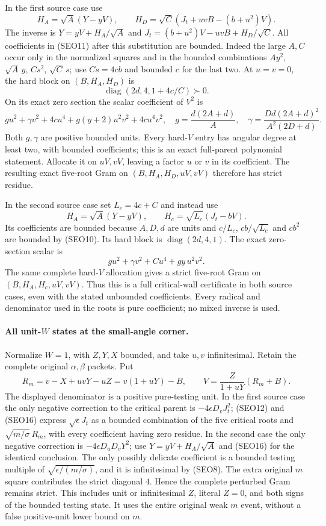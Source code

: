 In the first source case use
\[
 H_A=\sqrt A(Y-yV),\qquad
 H_D=\sqrt C(J_t+uvB-(b+u^2)V).
 \tag{SEO12}
\]
The inverse is $Y=yV+H_A/\sqrt A$ and
$J_t=(b+u^2)V-uvB+H_D/\sqrt C$.
All coefficients in (SEO11) after this substitution are bounded.
Indeed the large $A,C$ occur only in the normalized squares and in
the bounded combinations $Ay^2$, $\sqrt A\,y$, $Cs^2$,
$\sqrt C\,s$; use $Cs=4cb$ and bounded $c$ for the last two.
At $u=v=0$, the hard block on $(B,H_A,H_D)$ is
\[
 \operatorname{diag}(2d,4,1+4c/C)\succ0.
\]
On its exact zero section the scalar coefficient of $V^2$ is
\[
 g u^2+\gamma v^2+4cu^4+g(y+2)u^2v^2+4cu^4v^2,
 \quad g=\frac{d(2A+d)}A,\quad
 \gamma=\frac{Dd(2A+d)^2}{A^2(2D+d)}.             \tag{SEO13}
\]
Both $g,\gamma$ are positive bounded units. Every hard-$V$ entry
has angular degree at least two, with bounded coefficients; this is
an exact full-parent polynomial statement. Allocate it on $uV,vV$,
leaving a factor $u$ or $v$ in its coefficient. The resulting exact
five-root Gram on $(B,H_A,H_D,uV,vV)$ therefore has strict residue.

In the second source case set $L_c=4c+C$ and instead use
\[
 H_A=\sqrt A(Y-yV),\qquad
 H_c=\sqrt{L_c}(J_t-bV).                         \tag{SEO14}
\]
Its coefficients are bounded because $A,D,d$ are units and
$c/L_c$, $cb/\sqrt{L_c}$ and $cb^2$ are bounded by (SEO10).
Its hard block is $\operatorname{diag}(2d,4,1)$.
The exact zero-section scalar is
\[
 g u^2+\gamma v^2+C u^4+gy\,u^2v^2.
 \tag{SEO15}
\]
The same complete hard-$V$ allocation gives a strict five-root
Gram on $(B,H_A,H_c,uV,vV)$. Thus this is a full critical-wall
certificate in both source cases, even with the stated unbounded
coefficients. Every radical and denominator used in the roots is
pure coefficient; no mixed inverse is used.

\paragraph{All unit-$W$ states at the small-angle corner.}
Normalize $W=1$, with $Z,Y,X$ bounded, and take $u,v$ infinitesimal.
Retain the complete original $\alpha,\beta$ packets. Put
\[
 R_m=v-X+uvY-uZ=v(1+uY)-B,\qquad
 V=\frac{Z}{1+uY}(R_m+B).                        \tag{SEO16}
\]
The displayed denominator is a positive pure-testing unit.
In the first source case the only negative correction to the
critical parent is $-4\epsilon D_vJ_t^2$; (SEO12) and (SEO16)
express $\sqrt\epsilon J_t$ as a bounded combination of the five
critical roots and $\sqrt{m/\sigma}\,R_m$, with every coefficient
having zero residue. In the second case the only negative
correction is $-4\epsilon D_uD_vY^2$; use
$Y=yV+H_A/\sqrt A$ and (SEO16) for the identical conclusion.
The only possibly delicate coefficient is a bounded testing
multiple of $\sqrt{\epsilon/(m/\sigma)}$, and it is infinitesimal
by (SEO8). The extra original $m$ square contributes the strict
diagonal $4$. Hence the complete perturbed Gram remains strict.
This includes unit or infinitesimal $Z$, literal $Z=0$, and both
signs of the bounded testing state. It uses the entire original
weak $m$ event, without a false positive-unit lower bound on $m$.

